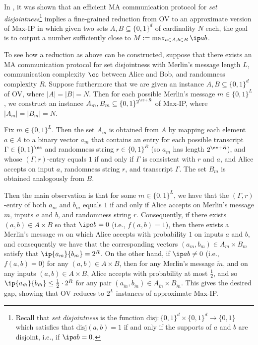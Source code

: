 \documentclass[11pt]{article}
\begin{document}
In \cite{ARW17}, it was shown that an efficient MA communication protocol for \emph{set disjointness}\footnote{Recall that \emph{set disjointness} is the function $\mathrm{disj}:\{0,1\}^d \times \{0,1\}^d \to \{0,1\}$ which satisfies that $
\mathrm{disj}(a,b)=1$ if and only if the supports of $a$ and $b$ are disjoint, i.e., if $\ip a b =0$.} implies a fine-grained reduction from OV to an approximate version of Max-IP in which given two sets $A, B\subseteq\{0,1\}^d$ of cardinality $N$ each, the goal is to output a number sufficiently close to $M:=\max_{a \in A, b \in B} \ip a b$.

To see how a reduction as above can be constructed, suppose that there exists an MA communication protocol for set disjointness with Merlin's message length $L$, communication complexity $\cc$ between Alice and Bob, and randomness complexity $R$. Suppose furthermore that we are given an instance $A,B \subseteq \{0,1\}^d$ of OV, where $|A|=|B|=N$. Then for each possible Merlin's message $m \in \{0,1\}^L$, we construct an instance $A_m,B_m \subseteq \{0,1\}^{ 2^{\cc+R} }$ of Max-IP, where $|A_m| = |B_m|=N$.

Fix $m \in \{0,1\}^L$. Then the set $A_m$ is obtained from $A$ by mapping each element $a \in A$  to a binary vector $a_m$ that contains an entry for each possible transcript $\Gamma \in \{0,1\}^{\cc}$ and randomness string $r \in \{0,1\}^R$ (so $a_m$ has length $2^{\cc+R}$), and whose $(\Gamma, r)$-entry equals $1$ if and only if $\Gamma$ is consistent with $r$ and $a$, and Alice accepts on input $a$, randomness string $r$, and transcript $\Gamma$.
The set $B_m$ is obtained analogously from $B$. 

Then the main observation is that for some $m \in \{0,1\}^L$, we have that the $(\Gamma,r)$-entry of both $a_m$ and $b_m$ equals $1$ if and only if Alice accepts on Merlin's message $m$, inputs $a$ and $b$, and randomness string $r$. Consequently, if there exists $(a,b) \in A \times B$ so that $\ip a b =0$ (i.e., $f(a,b)=1$), then there exists a Merlin's message $m$ on which Alice accepts with probability $1$ on inputs $a$ and $b$, and consequently we have that the corresponding vectors
$(a_m,b_m) \in A_m \times B_m$ satisfy that $\ip {a_m} {b_m} = 2^R$. 
On the other hand, if 
$\ip a b \neq 0$ (i.e., $f(a,b) =0$) for any $(a,b) \in A \times B$, then for any Merlin's message $\tilde m$, and on any inputs $(a,b) \in A \times B$, Alice accepts with probability at most $\frac 1 2$, and so $\ip {a_{\tilde m}} {b_{\tilde m}} \leq \frac 1 2 \cdot 2^R$ for any pair
$(a_{\tilde m},b_{\tilde m}) \in A_{\tilde m} \times B_{\tilde m}$. This gives the desired gap, showing that OV reduces to $2^L$ instances of approximate Max-IP. 
\end{document}
